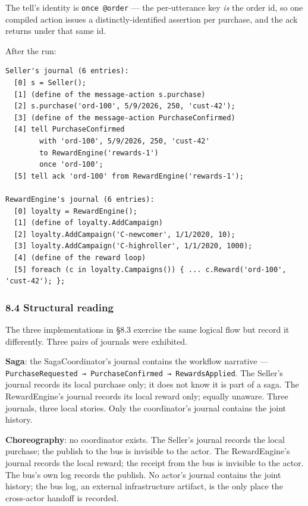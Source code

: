 \documentclass[
]{article}
\let\origtexttt\texttt%
\renewcommand{\texttt}[1]{\origtexttt{\seqsplit{#1}}}%
\let\texttt\origtexttt%
\begin{document}
The tell's identity is \texttt{once\ @order} --- the per-utterance key
\emph{is} the order id, so one compiled action issues a
distinctly-identified assertion per purchase, and the ack returns under
that same id.

After the run:

\begin{verbatim}
Seller's journal (6 entries):
  [0] s = Seller();
  [1] (define of the message-action s.purchase)
  [2] s.purchase('ord-100', 5/9/2026, 250, 'cust-42');
  [3] (define of the message-action PurchaseConfirmed)
  [4] tell PurchaseConfirmed
        with 'ord-100', 5/9/2026, 250, 'cust-42'
        to RewardEngine('rewards-1')
        once 'ord-100';
  [5] tell ack 'ord-100' from RewardEngine('rewards-1');

RewardEngine's journal (6 entries):
  [0] loyalty = RewardEngine();
  [1] (define of loyalty.AddCampaign)
  [2] loyalty.AddCampaign('C-newcomer', 1/1/2020, 10);
  [3] loyalty.AddCampaign('C-highroller', 1/1/2020, 1000);
  [4] (define of the reward loop)
  [5] foreach (c in loyalty.Campaigns()) { ... c.Reward('ord-100', 'cust-42'); };
\end{verbatim}

\subsubsection{8.4 Structural reading}\label{structural-reading}

The three implementations in §8.3 exercise the same logical flow but
record it differently. Three pairs of journals were exhibited.

\textbf{Saga}: the SagaCoordinator's journal contains the workflow
narrative ---
\texttt{PurchaseRequested\ →\ PurchaseConfirmed\ →\ RewardsApplied}. The
Seller's journal records its local purchase only; it does not know it is
part of a saga. The RewardEngine's journal records its local reward
only; equally unaware. Three journals, three local stories. Only the
coordinator's journal contains the joint history.

\textbf{Choreography}: no coordinator exists. The Seller's journal
records the local purchase; the publish to the bus is invisible to the
actor. The RewardEngine's journal records the local reward; the receipt
from the bus is invisible to the actor. The bus's own log records the
publish. No actor's journal contains the joint history; the bus log, an
external infrastructure artifact, is the only place the cross-actor
handoff is recorded.
\end{document}
